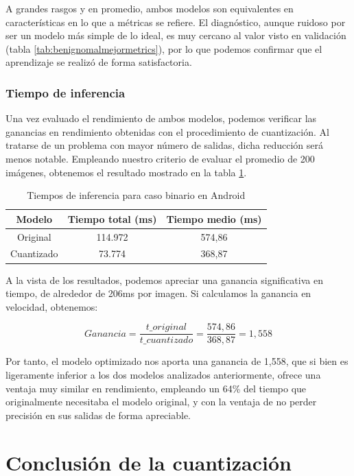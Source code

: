 A grandes rasgos y en promedio, ambos modelos son equivalentes en características en lo que a métricas se refiere. El diagnóstico, aunque ruidoso por ser un modelo más simple de lo ideal, es muy cercano al valor visto en validación (tabla \ref{tab:benignomalmejormetrics}), por lo que podemos confirmar que el aprendizaje se realizó de forma satisfactoria.

\subsubsection{Tiempo de inferencia}
Una vez evaluado el rendimiento de ambos modelos, podemos verificar las ganancias en rendimiento obtenidas con el procedimiento de cuantización. Al tratarse de un problema con mayor número de salidas, dicha reducción será menos notable. Empleando nuestro criterio de evaluar el promedio de 200 imágenes, obtenemos el resultado mostrado en la tabla \ref{tab:infbin}.
\begin{table}[H]
	\centering
	\begin{tabular}{|c|c|c|}
		\hline
		Modelo & Tiempo total (ms) & Tiempo medio (ms) \\ \hline
		Original & 114.972 & 574,86	 \\ \hline
		Cuantizado & 73.774 & 368,87 \\ \hline
	\end{tabular}
	\caption{Tiempos de inferencia para caso binario en Android}
	\label{tab:infbin}
\end{table}

A la vista de los resultados, podemos apreciar una ganancia significativa en tiempo, de alrededor de 206ms por imagen. Si calculamos la ganancia en velocidad, obtenemos:

$$Ganancia = \frac{t\_original}{t\_cuantizado} = \frac{574,86}{368,87} = 1,558$$

Por tanto, el modelo optimizado nos aporta una ganancia de 1,558, que si bien es ligeramente inferior a los dos modelos analizados anteriormente, ofrece una ventaja muy similar en rendimiento, empleando un 64\% del tiempo que originalmente necesitaba el modelo original, y con la ventaja de no perder precisión en sus salidas de forma apreciable.


\section{Conclusión de la cuantización}

